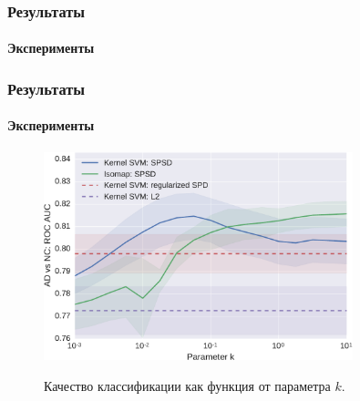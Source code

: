 \documentclass[xcolor=table]{beamer}
\begin{document}
    \begin{frame}
    \frametitle{Результаты}
    \framesubtitle{Эксперименты}
    \begin{table}[h!]
    \centering
    \caption{Сравнительные результаты классификации всех четырех алгоритмов, рассматривавшихся в работе. Цветом выделены лучшие результаты для каждой пары классов. Метрика качества – ROC AUC}
    \end{table}
    \end{frame}
    
    \begin{frame}
    \frametitle{Результаты}
    \framesubtitle{Эксперименты}
    \begin{figure}[h!]
    \centering
    \includegraphics[width=0.8\textwidth]{img/k_dep.pdf}\label{fig:clf_quality}
    \caption{Качество классификации как функция от параметра $k$.}
    \end{figure}
    \end{frame}
\end{document}
